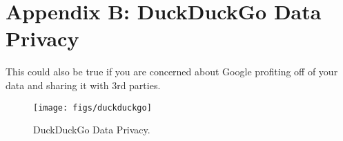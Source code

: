 \clearpage

\section{Appendix B: DuckDuckGo Data Privacy}

This could also be true if you are concerned about Google profiting off of your data and sharing it with 3rd parties.

\begin{figure}[H]
  \centering
  \texttt{[image: figs/duckduckgo]}
  \caption{DuckDuckGo Data Privacy.}
  \label{fig::1}
\end{figure}


